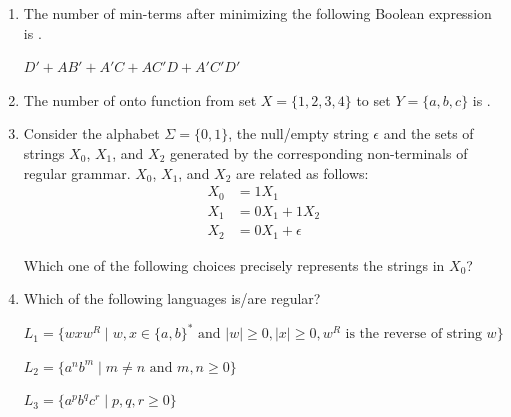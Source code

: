 \documentclass[journal,12pt,onecolumn]{IEEEtran}
\theoremstyle{remark}
\begin{document}
\begin{enumerate}
		\item The number of min-terms after minimizing the following Boolean expression is \underline{\hspace{2cm}}.
		
		$D' + AB' + A'C + AC'D + A'C'D'$
		
		\hfill{}
		
		\item The number of onto function  from set $X = \{1,2,3,4\}$ to set $Y = \{a,b,c\}$ is \underline{\hspace{2cm}}.
		
		\hfill{}
		
		\item Consider the alphabet $\Sigma = \{0,1\}$, the null/empty string $\epsilon$ and the sets of strings $X_0$, $X_1$, and $X_2$ generated by the corresponding non-terminals of regular grammar. $X_0$, $X_1$, and $X_2$ are related as follows:
		\begin{align*}
			X_0 &= 1X_1\\
			X_1 &= 0X_1 + 1X_2\\
			X_2 &= 0X_1 + \epsilon
		\end{align*}
		
		Which one of the following choices precisely represents the strings in $X_0$?
		
		\hfill{}
		
		\begin{enumerate}
		\end{enumerate}
		
		\item Which of the following languages is/are regular?
		
		$L_1 = \{wxw^R \mid w, x \in \{a, b\}^* \text{ and } |w| \geq 0 , |x| \geq 0, w^R \text{ is the reverse of string } w\}$
		
		$L_2 = \{a^n b^m \mid m \neq n \text{ and } m, n \geq 0\}$
		
		$L_3 = \{a^p b^q c^r \mid p,q, r \geq 0\}$
		

\end{enumerate}
\end{document}
